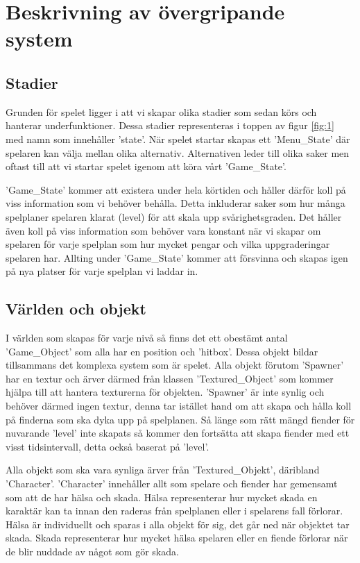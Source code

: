 \documentclass{TDP005mall}
\begin{document}
\section{Beskrivning av övergripande system}

\subsection{Stadier}
Grunden för spelet ligger i att vi skapar olika stadier som sedan körs och hanterar underfunktioner. Dessa stadier representeras i toppen av figur \ref{fig:1} med namn som innehåller 'state'. När spelet startar skapas ett 'Menu\_State' där spelaren kan välja mellan olika alternativ. Alternativen leder till olika saker men oftast till att vi startar spelet igenom att köra vårt 'Game\_State'. 

'Game\_State' kommer att existera under hela körtiden och håller därför koll på viss information som vi behöver behålla. Detta inkluderar saker som hur många spelplaner spelaren klarat (level) för att skala upp svårighetsgraden. Det håller även koll på viss information som behöver vara konstant när vi skapar om spelaren för varje spelplan som hur mycket pengar och vilka uppgraderingar spelaren har. Allting under 'Game\_State' kommer att försvinna och skapas igen på nya platser för varje spelplan vi laddar in.

\subsection{Världen och objekt}
I världen som skapas för varje nivå så finns det ett obestämt antal 'Game\_Object' som alla har en position och 'hitbox'. Dessa objekt bildar tillsammans det komplexa system som är spelet. Alla objekt förutom 'Spawner' har en textur och ärver därmed från klassen 'Textured\_Object' som kommer hjälpa till att hantera texturerna för objekten. 'Spawner' är inte synlig och behöver därmed ingen textur, denna tar istället hand om att skapa och hålla koll på finderna som ska dyka upp på spelplanen. Så länge som rätt mängd fiender för nuvarande 'level' inte skapats så kommer den fortsätta att skapa fiender med ett visst tidsintervall, detta också baserat på 'level'.

Alla objekt som ska vara synliga ärver från 'Textured\_Objekt', däribland 'Character'. 'Character' innehåller allt som spelare och fiender har gemensamt som att de har hälsa och skada. Hälsa representerar hur mycket skada en karaktär kan ta innan den raderas från spelplanen eller i spelarens fall förlorar. Hälsa är individuellt och sparas i alla objekt för sig, det går ned när objektet tar skada. Skada representerar hur mycket hälsa spelaren eller en fiende förlorar när de blir nuddade av något som gör skada.
\end{document}
